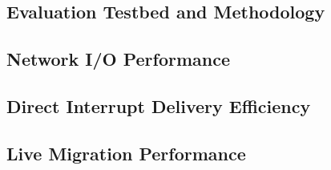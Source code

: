 \subsection{Evaluation Testbed and Methodology}


\subsection{Network I/O Performance}


\subsection{Direct Interrupt Delivery Efficiency}


\subsection{Live Migration Performance}

